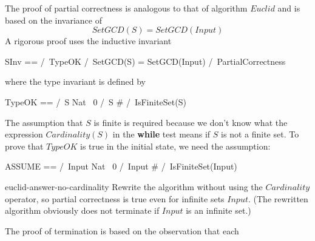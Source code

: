 The proof of partial correctness is analogous to that of 
algorithm $Euclid$ and is based on the invariance of
 \[ SetGCD(S) = SetGCD(Input) \]
A rigorous proof uses the inductive invariant
\begin{display}
\begin{notla}
SInv == /\ TypeOK
        /\ SetGCD(S) = SetGCD(Input)
        /\ PartialCorrectness
\end{notla}
\begin{tlatex}
%
%
%
\end{tlatex}
\end{display}
where the type invariant is defined by
\begin{display}
\begin{notla}
TypeOK == /\ S \subseteq Nat \ {0}
          /\ S # {} 
          /\ IsFiniteSet(S)
\end{notla}
\begin{tlatex}
%
%
\end{tlatex}
\end{display}
The assumption that $S$ is finite is required because we don't know
what the expression $Cardinality(S)$ in the \textbf{while} test means
if $S$ is not a finite set.  To prove that $TypeOK$ is true in the
initial state, we need the assumption:
\begin{display}
\begin{notla}
ASSUME == /\ Input \subseteq Nat \ {0}
          /\ Input # {}
          /\ IsFiniteSet(Input)
\end{notla}
\begin{tlatex}
%
%
\end{tlatex}
\end{display}
\begin{aquestion}{euclid-answer-no-cardinality}
Rewrite the algorithm without using the $Cardinality$ operator, so
partial correctness is true even for infinite sets $Input$.  (The
rewritten algorithm obviously does not terminate if $Input$ is an
infinite set.)
\end{aquestion}
%
The proof of termination is based on the observation that each
